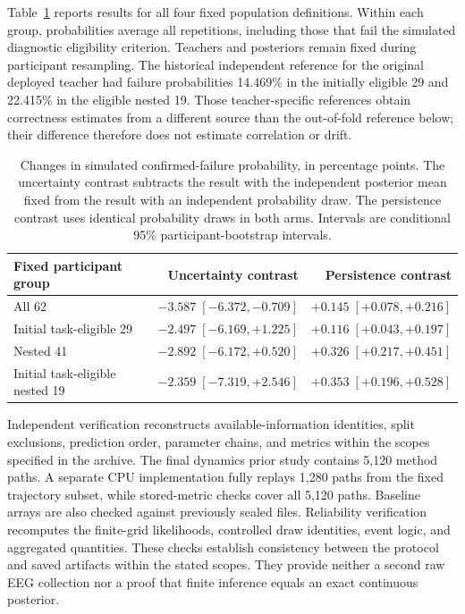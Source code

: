 \documentclass[11pt,a4paper]{article}
\begin{document}
Table~\ref{tab:reliability} reports results for all four fixed population definitions. Within each group, probabilities average all repetitions, including those that fail the simulated diagnostic eligibility criterion. Teachers and posteriors remain fixed during participant resampling. The historical independent reference for the original deployed teacher had failure probabilities 14.469\% in the initially eligible 29 and 22.415\% in the eligible nested 19. Those teacher-specific references obtain correctness estimates from a different source than the out-of-fold reference below; their difference therefore does not estimate correlation or drift.

\begin{table}[h]
\centering\small
\caption{Changes in simulated confirmed-failure probability, in percentage points. The uncertainty contrast subtracts the result with the independent posterior mean fixed from the result with an independent probability draw. The persistence contrast uses identical probability draws in both arms. Intervals are conditional 95\% participant-bootstrap intervals.}
\label{tab:reliability}
\begin{tabular}{@{}lrr@{}}
\toprule
Fixed participant group & Uncertainty contrast & Persistence contrast\\
\midrule
All 62 & $-3.587\;[-6.372,-0.709]$ & $+0.145\;[+0.078,+0.216]$\\
Initial task-eligible 29 & $-2.497\;[-6.169,+1.225]$ & $+0.116\;[+0.043,+0.197]$\\
Nested 41 & $-2.892\;[-6.172,+0.520]$ & $+0.326\;[+0.217,+0.451]$\\
Initial task-eligible nested 19 & $-2.359\;[-7.319,+2.546]$ & $+0.353\;[+0.196,+0.528]$\\
\bottomrule
\end{tabular}
\end{table}

Independent verification reconstructs available-information identities, split exclusions, prediction order, parameter chains, and metrics within the scopes specified in the archive. The final dynamics prior study contains 5,120 method paths. A separate CPU implementation fully replays 1,280 paths from the fixed trajectory subset, while stored-metric checks cover all 5,120 paths. Baseline arrays are also checked against previously sealed files. Reliability verification recomputes the finite-grid likelihoods, controlled draw identities, event logic, and aggregated quantities. These checks establish consistency between the protocol and saved artifacts within the stated scopes. They provide neither a second raw EEG collection nor a proof that finite inference equals an exact continuous posterior.
\end{document}

